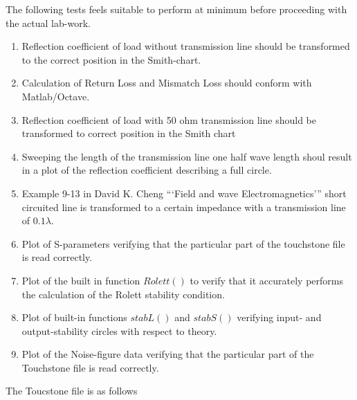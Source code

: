 \documentclass{article}
\begin{document}
\begin{multicols}{2}
The following tests feels suitable to perform at minimum before proceeding with the actual lab-work.
\begin{enumerate}[label=(\alph*)]
\item Reflection coefficient of load without transmission line should be transformed to the correct position in the Smith-chart.
\item Calculation of Return Loss and Mismatch Loss should conform with Matlab/Octave.
\item Reflection coefficient of load with 50 ohm transmission line should be transformed to correct position in the Smith chart
\item Sweeping the length of the transmission line one half wave length shoul result in a plot of the reflection coefficient
describing a full circle.
\item Example 9-13 in David K. Cheng ```Field and wave Electromagnetics''' short circuited line is transformed to a certain
impedance with a transmission line of $0.1\lambda$.
\item Plot of S-parameters verifying that the particular part of the touchstone file is read correctly.
\item Plot of the built in function $Rolett()$ to verify that it accurately performs the calculation of the
Rolett stability condition.
\item Plot of built-in functions $stabL()$ and $stabS()$ verifying input- and output-stability circles with respect to theory.
\item Plot of the Noise-figure data verifying that the particular part of the Touchstone file is read correctly.
\end{enumerate}
\end{multicols}
The Toucstone file is as follows
\end{document}
